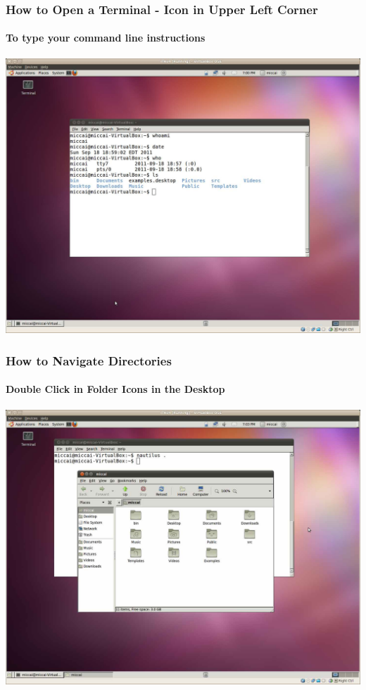 {
\begin{frame}
\frametitle{How to Open a Terminal - Icon in Upper Left Corner}
\framesubtitle{To type your command line instructions}
\begin{center}
\includegraphics[width=0.7\paperwidth]{../Art/Screenshot-OpenTerminal.jpg}
\end{center}
\end{frame}
}

{
\begin{frame}
\frametitle{How to Navigate Directories}
\framesubtitle{Double Click in Folder Icons in the Desktop}
\begin{center}
\includegraphics[width=0.7\paperwidth]{../Art/Screenshot-Nautilus.jpg}
\end{center}
\end{frame}
}

